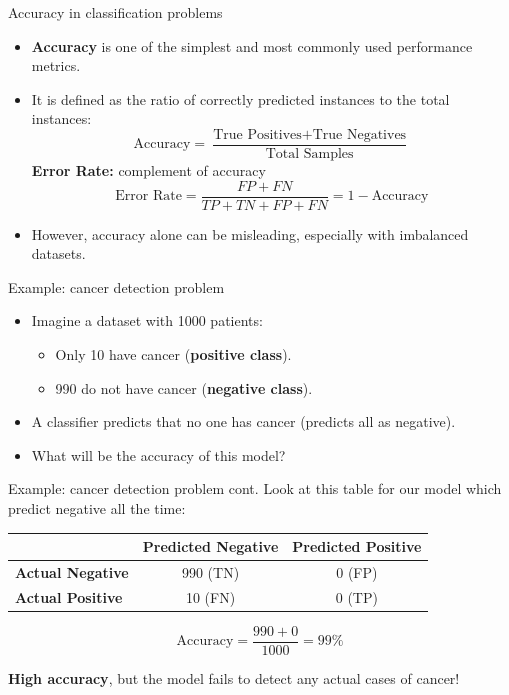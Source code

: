 \documentclass[serif, aspectratio=169]{beamer}
\begin{document}
\begin{frame}{Accuracy in classification problems}
    \begin{itemize}
        \item \textbf{Accuracy} is one of the simplest and most commonly used performance metrics.
        \item It is defined as the ratio of correctly predicted instances to the total instances:
        \[
        \text{Accuracy} = \frac{\text{True Positives} + \text{True Negatives}}{\text{Total Samples}}
        \]
        \textbf{Error Rate:} complement of accuracy
        \[
        \text{Error Rate} = \frac{FP + FN}{TP + TN + FP + FN} = 1 - \text{Accuracy}
    \]
        \item However, accuracy alone can be misleading, especially with imbalanced datasets.
    \end{itemize}
\end{frame}

\begin{frame}{Example: cancer detection problem}
    \begin{itemize}
        \item Imagine a dataset with 1000 patients:
        \begin{itemize}
            \item Only 10 have cancer (\textbf{positive class}).
            \item 990 do not have cancer (\textbf{negative class}).
        \end{itemize}
        \item A classifier predicts that no one has cancer (predicts all as negative).
        \item What will be the accuracy of this model?
    \end{itemize}
\end{frame}

\begin{frame}{Example: cancer detection problem cont.}
    Look at this table for our model which predict negative all the time:
    
    \begin{table}[h!]
        \centering
        \begin{tabular}{@{}lcc@{}}
            \toprule
            & \textbf{Predicted Negative} & \textbf{Predicted Positive} \\ \midrule
            \textbf{Actual Negative} & 990 (TN) & 0 (FP) \\
            \textbf{Actual Positive} & 10 (FN)  & 0 (TP) \\ \bottomrule
        \end{tabular}
    \end{table}
    
    \[
    \text{Accuracy} = \frac{990 + 0}{1000} = 99\%
    \]
    
    \textbf{High accuracy}, but the model fails to detect any actual cases of cancer!
\end{frame}
\end{document}
